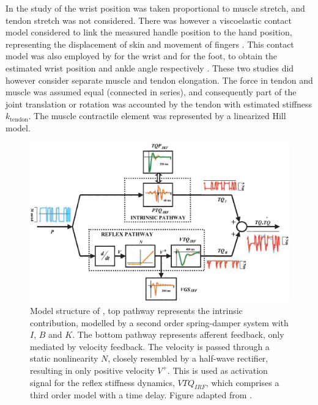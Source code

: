 In the study of \citeauthor{van_der_helm_identification_2002} the wrist position was taken proportional to muscle stretch, and tendon stretch was not considered. There was however a viscoelastic contact model considered to link the measured handle position to the hand position, representing the displacement of skin and movement of fingers \cite{van_der_helm_identification_2002}. This contact model was also employed by \citeauthor{schouten_nmclab_2008} for the wrist and \citeauthor{mugge_rigorous_2010} for the foot, to obtain the estimated wrist position and ankle angle respectively \cite{schouten_nmclab_2008,mugge_rigorous_2010}. These two studies did however consider separate muscle and tendon elongation. The force in tendon and muscle was assumed equal (connected in series), and consequently part of the joint translation or rotation was accounted by the tendon with estimated stiffness $k_\text{tendon}$. The muscle contractile element was represented by a linearized Hill model. 



\begin{figure}[t]
    \centering
    \includegraphics[width=\linewidth]{Figures/models_assumptions/model_mirbagheri_2000.png}
    \caption{Model structure of \citeauthor{mirbagheri_intrinsic_2000}, top pathway represents the intrinsic contribution, modelled by a second order spring-damper system with $I$, $B$ and $K$. The bottom pathway represents afferent feedback, only mediated by velocity feedback. The velocity is passed through a static nonlinearity $N$, closely resembled by a half-wave rectifier, resulting in only positive velocity $V^+$. This is used as activation signal for the reflex stiffness dynamics, $VTQ_{IRF}$, which comprises  a third order model with a time delay. Figure adapted from \citet{mirbagheri_intrinsic_2000}.}
    \label{fig:model_mirbagheri_2000}
\end{figure}



